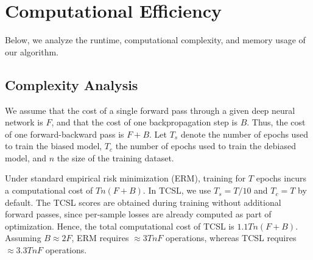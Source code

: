 \documentclass[letter,11pt]{article}
\begin{document}
\begin{table}[!hbtp]
\centering
{}
\caption{We compare the WGA and AVG for different $T_s$ at $r=0.1$ across datasets. Results are averaged over 3 seeds. The best WGA for each dataset is shown in \textbf{bold} and the second-best value is \underline{underlined}. $T_s=T/10$ represents what was originally reported.}
\label{tab:ts_ablation}
\end{table}
\section{Computational Efficiency}\label{sec:app_rcsm}

Below, we analyze the runtime, computational complexity, and memory usage of our algorithm.

\subsection{Complexity Analysis}

We assume that the cost of a single forward pass through a given deep neural network is $F$, and that the cost of one backpropagation step is $B$. Thus, the cost of one forward-backward pass is $F+B$. Let $T_s$ denote the number of epochs used to train the biased model, $T_c$ the number of epochs used to train the debiased model, and $n$ the size of the training dataset.

Under standard empirical risk minimization (ERM), training for $T$ epochs incurs a computational cost of $Tn(F+B)$. In TCSL, we use $T_s=T/10$ and $T_c=T$ by default. The TCSL scores are obtained during training without additional forward passes, since per-sample losses are already computed as part of optimization. Hence, the total computational cost of TCSL is $1.1Tn(F+B)$. Assuming $B \approx 2F$, ERM requires $\approx 3TnF$ operations, whereas TCSL requires $\approx 3.3TnF$ operations.
\end{document}

